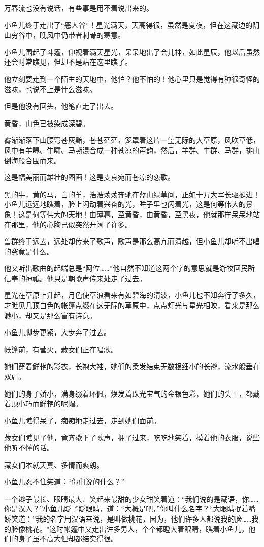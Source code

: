 \documentclass[12pt,oneside]{book}
\begin{document}
万春流也没有说话，有些事是用不着说出来的。

小鱼儿终于走出了``恶人谷''！星光满天，天高得很，虽然是夏夜，但在这藏边的阴山穷谷中，晚风中仍带者刺骨的寒意。

小鱼儿围起了斗篷，仰视着满天星光，呆呆地出了会儿神，如此星辰，他以后虽然还会时常瞧见，但却不是站在这里瞧了。

他立刻要走到一个陌生的天地中，他怕？他不怕的！他心里只是觉得有种很奇怪的滋味，也说不上是什么滋味。

但是他没有回头，他笔直走了出去。

黄昏，山色已被染成深碧。

雾渐渐落下山腰穹苍灰黯，苍苍茫茫，笼罩着这片一望无际的大草原，风吹草低，风中有羊嗥、牛啸、马嘶混合成一种苍凉的声韵，然后，羊群、牛群、马群，排山倒海般合围而来。

这是幅美丽而雄壮的图画！这是支哀宛而苍凉的恋歌。

黑的牛，黄的马，白的羊，浩浩荡荡奔驰在蓝山绿草间，正如十万大军长驱挺进！小鱼儿远远地瞧着，脸上闪动着兴奋的光，眸子里也闪着光，这是何等伟大的景象！这是何等伟大的天地！由薄暮，至黄昏，由黄昏，至黑夜，他就那样呆呆地站在那里，他的心胸己似突然开阔了许多。

兽群终于远去，远处却传来了歌声，歌声是那么高亢而清越，但小鱼儿却听不出唱的究竟是什么。

他又听出歌曲的起端总是``阿位\ldots\ldots{}''他自然不知道这两个字的意思就是游牧回民所信奉的神祗。他只是朝歌声传来处走了过去。

星光在草原上升起，月色使草浪看来有如碧海的清波，小鱼儿也不知奔行了多久，才瞧见几顶白色的帐篷点缀在这无际的草原中，点点灯光与星光相映，看来是那么渺小，却又是那么富有诗意。

小鱼儿脚步更紧，大步奔了过去。

帐篷前，有营火，藏女们正在唱歌。

她们穿着鲜艳的彩衣，长袍大袖，她们的柔发结束无数根细小的长辫，流水般垂在双肩。

她们的身子娇小，满身缀着环佩，焕发着珠光宝气的金银色彩，她们的头上，都戴着顶小巧而鲜艳的呢帽。

小鱼儿瞧得呆了，痴痴地走过去，走到她们面前。

藏女们瞧见了他，竟齐歇下了歌声，拥了过来，吃吃地笑着，摸着他的衣服，说些他听不懂的话。

藏女们本就天真、多情而爽朗。

小鱼儿忍不住笑道：``你们说的什么？''

一个辫子最长、眼睛最大、笑起来最甜的少女甜笑着道：``我们说的是藏语，你\ldots\ldots 你是汉人？''小鱼儿眨了眨眼睛，道：``大概是吧，''你叫什么名字？``大眼睛抿着嘴娇笑道：''我的名字用汉语来说，是叫做桃花，因为，他们许多人都说我的脸\ldots\ldots 我的脸像桃花。"这时帐篷中又走出许多男人，个个都瞪大着眼睛，瞧着小鱼儿，他们的身子虽不高大但却都结实得很。
\end{document}

